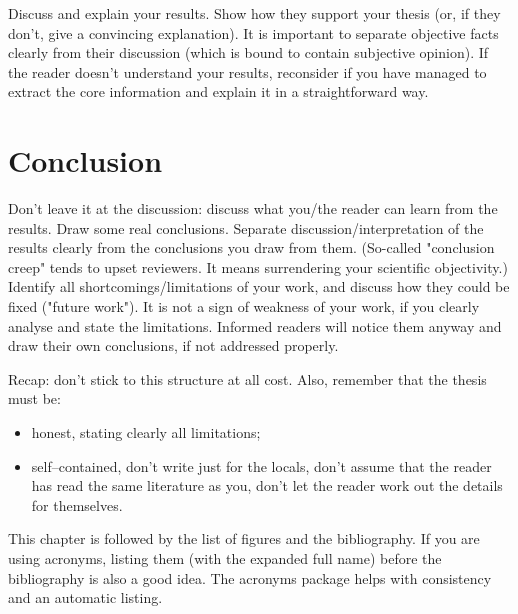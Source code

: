 \documentclass[a4paper,twoside, openright,12pt]{report}
\begin{document}
Discuss and explain your results. Show how they support your thesis (or, if they don't, give a convincing explanation). It is important to separate objective facts clearly from their discussion (which is bound to contain subjective opinion). If the reader doesn't understand your results, reconsider if you have managed to extract the core information and explain it in a straightforward way.




\chapter{Conclusion}

Don't leave it at the discussion: discuss what you/the reader can learn from the results. Draw some real conclusions. Separate discussion/interpretation of the results clearly from the conclusions you draw from them. (So-called "conclusion creep" tends to upset reviewers. It means surrendering your scientific objectivity.) Identify all shortcomings/limitations of your work, and discuss how they could be fixed ("future work"). It is not a sign of weakness of your work, if you clearly analyse and state the limitations. Informed readers will notice them anyway and draw their own conclusions, if not addressed properly.

\vspace{\baselineskip}
Recap: don't stick to this structure at all cost. Also, remember that the thesis must be:

\begin{itemize}
	\item honest, stating clearly all limitations;
	\item self--contained, don't write just for the locals, don't assume that the reader has read the same literature as you, don't let the reader work out the details for themselves.
\end{itemize}



This chapter is followed by the list of figures and the bibliography. If you are using acronyms, listing them (with the expanded full name) before the bibliography is also a good idea. The acronyms package helps with consistency and an automatic listing.


\end{document}
